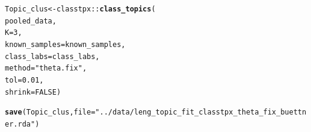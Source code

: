 \documentclass[12pt]{article}\usepackage[]{graphicx}\usepackage[usenames,dvipsnames]{color}
\makeatletter
\newcommand{\hlnum}[1]{\textcolor[rgb]{0.686,0.059,0.569}{#1}}%
\newcommand{\hlstr}[1]{\textcolor[rgb]{0.192,0.494,0.8}{#1}}%
\newcommand{\hlopt}[1]{\textcolor[rgb]{0,0,0}{#1}}%
\newcommand{\hlstd}[1]{\textcolor[rgb]{0.345,0.345,0.345}{#1}}%
\newcommand{\hlkwb}[1]{\textcolor[rgb]{0.69,0.353,0.396}{#1}}%
\newcommand{\hlkwc}[1]{\textcolor[rgb]{0.333,0.667,0.333}{#1}}%
\newcommand{\hlkwd}[1]{\textcolor[rgb]{0.737,0.353,0.396}{\textbf{#1}}}%
\newenvironment{kframe}{%
 \def\at@end@of@kframe{}%
 \ifinner\ifhmode%
  \def\at@end@of@kframe{\end{minipage}}%
  \begin{minipage}{\columnwidth}%
 \fi\fi%
 \def\FrameCommand##1{\hskip\@totalleftmargin \hskip-\fboxsep
 \colorbox{shadecolor}{##1}\hskip-\fboxsep
     \hskip-\linewidth \hskip-\@totalleftmargin \hskip\columnwidth}%
 \MakeFramed {\advance\hsize-\width
   \@totalleftmargin\z@ \linewidth\hsize
   \@setminipage}}%
 {\par\unskip\endMakeFramed%
 \at@end@of@kframe}
\newenvironment{knitrout}{}{} %
\makeatother
\begin{document}
\begin{knitrout}
\color{fgcolor}\begin{kframe}
\begin{alltt}
\hlstd{Topic_clus} \hlkwb{<-} \hlstd{classtpx}\hlopt{::}\hlkwd{class_topics}\hlstd{(}
    \hlstd{pooled_data,}
    \hlkwc{K}\hlstd{=}\hlnum{3}\hlstd{,}
    \hlkwc{known_samples} \hlstd{= known_samples,}
    \hlkwc{class_labs} \hlstd{= class_labs,}
    \hlkwc{method}\hlstd{=}\hlstr{"theta.fix"}\hlstd{,}
    \hlkwc{tol}\hlstd{=}\hlnum{0.01}\hlstd{,}
    \hlkwc{shrink}\hlstd{=}\hlnum{FALSE}\hlstd{)}

\hlkwd{save}\hlstd{(Topic_clus,} \hlkwc{file}\hlstd{=}\hlstr{"../data/leng_topic_fit_classtpx_theta_fix_buettner.rda"}\hlstd{)}
\end{alltt}
\end{kframe}
\end{knitrout}
\end{document}
